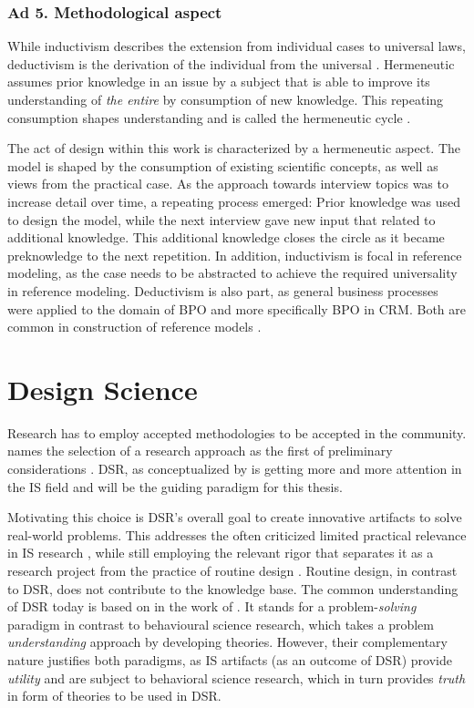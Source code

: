 \subsubsection{Ad 5. Methodological aspect}
While inductivism describes the extension from individual cases to universal laws, deductivism is the derivation of the individual from the universal \cite{seiffert2006einfhrung}. Hermeneutic assumes prior knowledge in an issue by a subject that is able to improve its understanding of \textit{the entire} by consumption of new knowledge. This repeating consumption shapes understanding and is called the hermeneutic cycle \citep{Butler1998}.

The act of design within this work is characterized by a hermeneutic aspect. The model is shaped by the consumption of existing scientific concepts, as well as views from the practical case. As the approach towards interview topics was to increase detail over time, a repeating process emerged: Prior knowledge was used to design the model, while the next interview gave new input that related to additional knowledge. This additional knowledge closes the circle as it became preknowledge to the next repetition. In addition, inductivism is focal in reference modeling, as the case needs to be abstracted to achieve the required universality in reference modeling. Deductivism is also part, as general business processes were applied to the domain of BPO and more specifically BPO in CRM.  Both are common in construction of reference models \citep{thomas2006mang,Fettke2014meth}.


\section{Design Science}
Research has to employ accepted methodologies to be accepted in the community. \citeauthor{creswell2013research} names the selection of a research approach as the first of preliminary considerations \citep{creswell2013research}. \acrfull{DSR}, as conceptualized by \cite{simon1996sciences} is getting more and more attention in the \acrshort{IS} field and will be the guiding paradigm for this thesis. 

Motivating this choice is \acrshort{DSR}'s overall goal to create innovative artifacts to solve real-world problems. This addresses the often criticized limited practical relevance in \acrshort{IS} research \citep{hirschheim}, while still employing the relevant rigor that separates it as a research project from the practice of routine design \citep{Winter2008Hevner}. Routine design, in contrast to \acrshort{DSR}, does not contribute to the knowledge base. The common understanding of \acrshort{DSR} today is based on in the work of \cite{Hevner2004}. It stands for a problem-\textit{solving} paradigm in contrast to behavioural science research, which takes a problem \textit{understanding} approach by developing theories. However, their complementary nature justifies both paradigms, as IS artifacts (as an outcome of \acrshort{DSR}) provide \textit{utility} and are subject to behavioral science research, which in turn provides \textit{truth} in form of theories to be used in \acrshort{DSR}.

